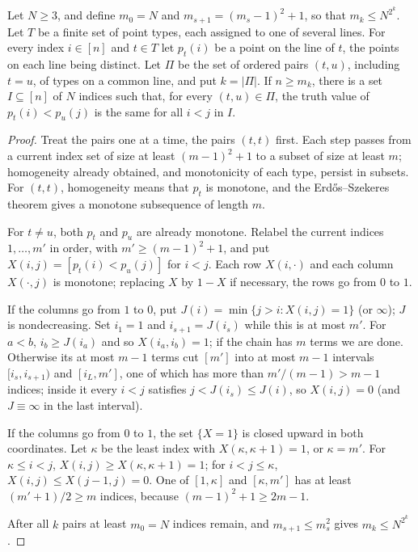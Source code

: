 \begin{lemma}
\label{lem:order-homogenize}
Let $N\ge3$, and define $m_0=N$ and
$m_{s+1}=(m_s-1)^2+1$, so that $m_k\le N^{2^k}$.
Let $T$ be a finite set of point types, each assigned to
one of several lines.  For every index $i\in[n]$ and
$t\in T$ let $p_t(i)$ be a point on the line of $t$, the
points on each line being distinct.  Let $\Pi$ be the set
of ordered pairs $(t,u)$, including $t=u$, of types on a
common line, and put $k=|\Pi|$.  If $n\ge m_k$, there is a
set $I\subseteq[n]$ of $N$ indices such that, for every
$(t,u)\in\Pi$, the truth value of $p_t(i)<p_u(j)$ is the
same for all $i<j$ in $I$.
\end{lemma}
\begin{proof}
Treat the pairs one at a time, the pairs $(t,t)$ first.  Each step passes
from a current index set of size at least $(m-1)^2+1$ to a subset of size at
least $m$; homogeneity already obtained, and monotonicity of each type,
persist in subsets.  For $(t,t)$, homogeneity means that $p_t$ is monotone, and
the Erd\H{o}s--Szekeres theorem gives a monotone subsequence of length $m$.

For $t\ne u$, both $p_t$ and $p_u$ are already monotone.  Relabel the current
indices $1,\ldots,m'$ in order, with $m'\ge(m-1)^2+1$, and put
$X(i,j)=[p_t(i)<p_u(j)]$ for $i<j$.  Each row $X(i,\cdot)$ and each column
$X(\cdot,j)$ is monotone; replacing $X$ by $1-X$ if necessary, the rows go
from $0$ to $1$.

If the columns go from $1$ to $0$, put $J(i)=\min\{j>i:X(i,j)=1\}$ (or
$\infty$); $J$ is nondecreasing.  Set $i_1=1$ and $i_{s+1}=J(i_s)$ while this
is at most $m'$.  For $a<b$, $i_b\ge J(i_a)$ and so $X(i_a,i_b)=1$; if the
chain has $m$ terms we are done.  Otherwise its at most $m-1$ terms cut $[m']$
into at most $m-1$ intervals $[i_s,i_{s+1})$ and $[i_L,m']$, one of which has
more than $m'/(m-1)>m-1$ indices; inside it every $i<j$ satisfies
$j<J(i_s)\le J(i)$, so $X(i,j)=0$ (and $J\equiv\infty$ in the last interval).

If the columns go from $0$ to $1$, the set $\{X=1\}$ is closed upward in both
coordinates.  Let $\kappa$ be the least index with $X(\kappa,\kappa+1)=1$, or
$\kappa=m'$.  For $\kappa\le i<j$, $X(i,j)\ge X(\kappa,\kappa+1)=1$; for
$i<j\le\kappa$, $X(i,j)\le X(j-1,j)=0$.  One of $[1,\kappa]$ and $[\kappa,m']$
has at least $(m'+1)/2\ge m$ indices, because $(m-1)^2+1\ge2m-1$.

After all $k$ pairs at least $m_0=N$ indices remain, and
$m_{s+1}\le m_s^2$ gives $m_k\le N^{2^k}$.
\end{proof}

